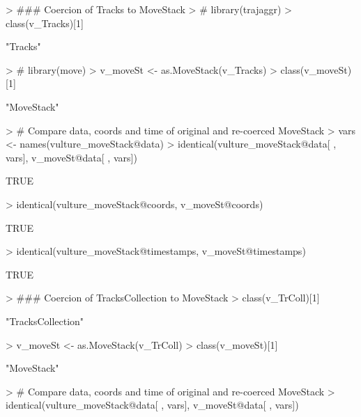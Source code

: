 \documentclass[12pt, oneside, a4paper]{scrbook}
\begin{document}
\begin{small}
\begin{Schunk}
\begin{Sinput}
> ### Coercion of Tracks to MoveStack
> # library(trajaggr)
> class(v_Tracks)[1]
\end{Sinput}
\begin{Soutput}
[1] "Tracks"
\end{Soutput}
\begin{Sinput}
> # library(move)
> v_moveSt <- as.MoveStack(v_Tracks)
> class(v_moveSt)[1]
\end{Sinput}
\begin{Soutput}
[1] "MoveStack"
\end{Soutput}
\begin{Sinput}
> # Compare data, coords and time of original and re-coerced MoveStack
> vars <- names(vulture_moveStack@data)
> identical(vulture_moveStack@data[ , vars], v_moveSt@data[ , vars])
\end{Sinput}
\begin{Soutput}
[1] TRUE
\end{Soutput}
\begin{Sinput}
> identical(vulture_moveStack@coords, v_moveSt@coords)
\end{Sinput}
\begin{Soutput}
[1] TRUE
\end{Soutput}
\begin{Sinput}
> identical(vulture_moveStack@timestamps, v_moveSt@timestamps) 
\end{Sinput}
\begin{Soutput}
[1] TRUE
\end{Soutput}
\begin{Sinput}
> ### Coercion of TracksCollection to MoveStack
> class(v_TrColl)[1]
\end{Sinput}
\begin{Soutput}
[1] "TracksCollection"
\end{Soutput}
\begin{Sinput}
> v_moveSt <- as.MoveStack(v_TrColl)
> class(v_moveSt)[1]
\end{Sinput}
\begin{Soutput}
[1] "MoveStack"
\end{Soutput}
\begin{Sinput}
> # Compare data, coords and time of original and re-coerced MoveStack
> identical(vulture_moveStack@data[ , vars], v_moveSt@data[ , vars])
\end{Sinput}
\begin{Soutput}

\end{Soutput}
\end{Schunk}
\end{small}
\end{document}
